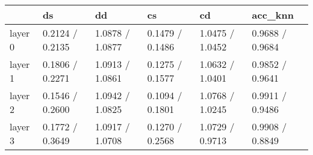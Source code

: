 \begin{tabular}{llllll}
\toprule
{} &               ds &               dd &               cs &               cd &          acc\_knn \\
\midrule
layer 0 &  0.2124 / 0.2135 &  1.0878 / 1.0877 &  0.1479 / 0.1486 &  1.0475 / 1.0452 &  0.9688 / 0.9684 \\
layer 1 &  0.1806 / 0.2271 &  1.0913 / 1.0861 &  0.1275 / 0.1577 &  1.0632 / 1.0401 &  0.9852 / 0.9641 \\
layer 2 &  0.1546 / 0.2600 &  1.0942 / 1.0825 &  0.1094 / 0.1801 &  1.0768 / 1.0245 &  0.9911 / 0.9486 \\
layer 3 &  0.1772 / 0.3649 &  1.0917 / 1.0708 &  0.1270 / 0.2568 &  1.0729 / 0.9713 &  0.9908 / 0.8849 \\
\bottomrule
\end{tabular}
